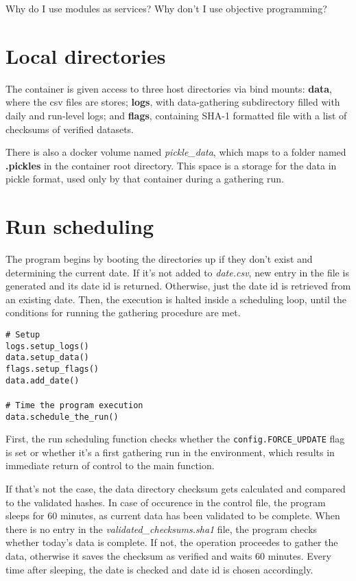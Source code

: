 Why do I use modules as services? Why don't I use objective programming?


\section{Local directories}
The container is given access to three host directories via bind mounts: \textbf{data}, where the csv files are stores; \textbf{logs}, with data-gathering subdirectory filled with daily and run-level logs; and \textbf{flags}, containing SHA-1 formatted file with a list of checksums of verified datasets. \par
There is also a docker volume named \textit{pickle\_data}, which maps to a folder named \textbf{.pickles} in the container root directory. This space is a storage for the data in pickle format, used only by that container during a gathering run.

\section{Run scheduling}
The program begins by booting the directories up if they don't exist and determining the current date. If it's not added to \textit{date.csv}, new entry in the file is generated and its date id is returned. Otherwise, just the date id is retrieved from an existing date. Then, the execution is halted inside a scheduling loop, until the conditions for running the gathering procedure are met. \par \noindent
\texttt{\# Setup \\ logs.setup\_logs() \\ data.setup\_data() \\ flags.setup\_flags() \\ data.add\_date() \\ \\ \# Time the program execution \\ data.schedule\_the\_run()}

First, the run scheduling function checks whether the \texttt{config.FORCE\_UPDATE} flag is set or whether it's a first gathering run in the environment, which results in immediate return of control to the main function. \par
If that's not the case, the data directory checksum gets calculated and compared to the validated hashes. In case of occurence in the control file, the program sleeps for 60 minutes, as current data has been validated to be complete. When there is no entry in the \textit{validated\_checksums.sha1} file, the program checks whether today's data is complete. If not, the operation proceedes to gather the data, otherwise it saves the checksum as verified and waits 60 minutes. Every time after sleeping, the date is checked and date id is chosen accordingly.

